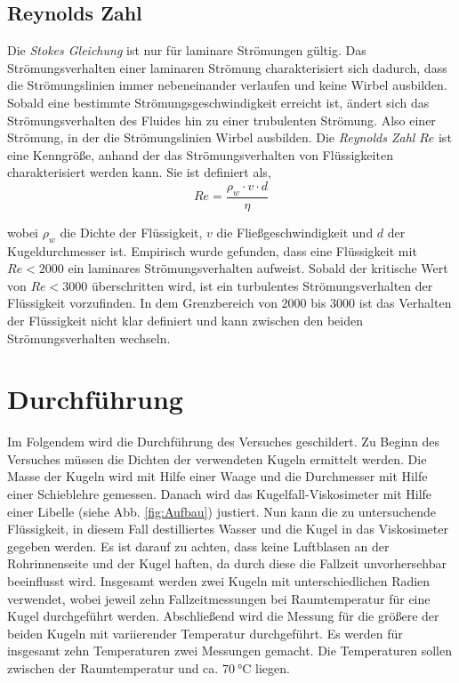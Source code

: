 \subsection{Reynolds Zahl}

Die \emph{Stokes Gleichung} ist nur für laminare Strömungen gültig. Das Strömungsverhalten einer laminaren Strömung charakterisiert sich
dadurch, dass die Strömungslinien immer nebeneinander verlaufen und keine Wirbel ausbilden. Sobald eine bestimmte Strömungsgeschwindigkeit
erreicht ist, ändert sich das Strömungsverhalten des Fluides hin zu einer trubulenten Strömung. Also einer Strömung, in der die Strömungslinien
Wirbel ausbilden. Die \emph{Reynolds Zahl} $Re$ ist eine Kenngröße, anhand der das Strömungsverhalten von Flüssigkeiten charakterisiert werden kann.
Sie ist definiert als,
\begin{equation}
  \label{eqn:Reynolds Zahl}
  Re = \frac{ \rho_{w} \cdot v \cdot d}{\eta}
\end{equation}

wobei $\rho_{w}$ die Dichte der Flüssigkeit, $v$ die Fließgeschwindigkeit und $d$ der Kugeldurchmesser ist.
Empirisch wurde gefunden, dass eine Flüssigkeit mit $Re < 2000$ ein laminares Strömungsverhalten aufweist. Sobald der kritische Wert von $Re < 3000$
überschritten wird, ist ein turbulentes Strömungsverhalten der Flüssigkeit vorzufinden. In dem Grenzbereich von $2000$ bis $3000$ ist das
Verhalten der Flüssigkeit nicht klar definiert und kann zwischen den beiden Strömungsverhalten wechseln. \cite{Reynold}

\section{Durchführung}

Im Folgendem wird die Durchführung des Versuches geschildert.
Zu Beginn des Versuches müssen die Dichten der verwendeten Kugeln ermittelt werden. Die Masse der Kugeln wird mit Hilfe einer Waage und
die Durchmesser mit Hilfe einer Schieblehre gemessen. Danach wird das Kugelfall-Viskosimeter mit Hilfe einer Libelle (siehe Abb. \ref{fig:Aufbau})
justiert. Nun kann die zu untersuchende Flüssigkeit, in diesem Fall destilliertes Wasser und die Kugel in das Viskosimeter gegeben werden.
Es ist darauf zu achten, dass keine Luftblasen an der Rohrinnenseite und der Kugel haften, da durch diese die
Fallzeit unvorhersehbar beeinflusst wird. Insgesamt werden zwei Kugeln mit unterschiedlichen Radien verwendet, wobei jeweil zehn
Fallzeitmessungen bei Raumtemperatur für eine Kugel durchgeführt werden.
Abschließend wird die Messung für die größere der beiden Kugeln mit variierender Temperatur durchgeführt. Es werden für insgesamt
zehn Temperaturen zwei Messungen gemacht. Die Temperaturen sollen zwischen der Raumtemperatur und ca. $\SI{70}{\celsius}$ liegen.


